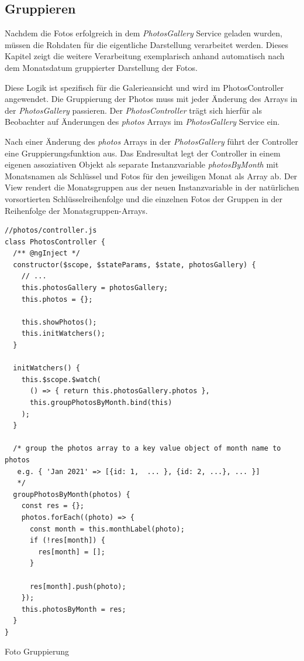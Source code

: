 \subsection{Gruppieren}

Nachdem die Fotos erfolgreich in dem \emph{PhotosGallery} Service geladen wurden, müssen die Rohdaten für die eigentliche Darstellung verarbeitet werden. Dieses Kapitel zeigt die weitere Verarbeitung exemplarisch anhand automatisch nach dem Monatsdatum gruppierter Darstellung der Fotos.

Diese Logik ist spezifisch für die Galerieansicht und wird im PhotosController angewendet. Die Gruppierung der Photos muss mit jeder Änderung des Arrays in der \emph{PhotosGallery} passieren. Der \emph{PhotosController} trägt sich hierfür als Beobachter auf Änderungen des \emph{photos} Arrays im \emph{PhotosGallery} Service ein.

Nach einer Änderung des \emph{photos} Arrays in der \emph{PhotosGallery} führt der Controller eine Gruppierungsfunktion aus. Das Endresultat legt der Controller in einem eigenen assoziativen Objekt als separate Instanzvariable \emph{photosByMonth} mit Monatsnamen als Schlüssel und Fotos für den jeweiligen Monat als Array ab. Der View rendert die Monatsgruppen aus der neuen Instanzvariable in der natürlichen vorsortierten Schlüsselreihenfolge und die einzelnen Fotos der Gruppen in der Reihenfolge der Monatsgruppen-Arrays.

\begin{listing}[H]
\begin{verbatim}
//photos/controller.js
class PhotosController {
  /** @ngInject */
  constructor($scope, $stateParams, $state, photosGallery) {
    // ...
    this.photosGallery = photosGallery;
    this.photos = {};

    this.showPhotos();
    this.initWatchers();
  }

  initWatchers() {
    this.$scope.$watch(
      () => { return this.photosGallery.photos },
      this.groupPhotosByMonth.bind(this)
    );
  }

  /* group the photos array to a key value object of month name to photos
   e.g. { 'Jan 2021' => [{id: 1,  ... }, {id: 2, ...}, ... }]
   */
  groupPhotosByMonth(photos) {
    const res = {};
    photos.forEach((photo) => {
      const month = this.monthLabel(photo);
      if (!res[month]) {
        res[month] = [];
      }

      res[month].push(photo);
    });
    this.photosByMonth = res;
  }
}

\end{verbatim}
\caption{Foto Gruppierung}
\label{lst:photo_group}
\end{listing}

